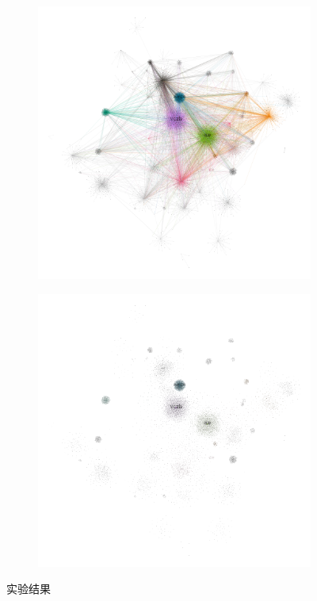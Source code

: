 \documentclass[bachelor,adobefonts]{jnuthesis}
\begin{document}
\begin{figure}[h!]
\begin{subfigure}[b]{0.4\linewidth}
    \caption{}
  \end{subfigure}
  \begin{subfigure}[b]{0.4\linewidth}
    \includegraphics[width=\linewidth]{Open1.png}
    \caption{}
  \end{subfigure}
  \begin{subfigure}[b]{0.4\linewidth}
    \includegraphics[width=\linewidth]{Open2.png}
    \caption{}
  \end{subfigure}
  \caption{实验结果}
\end{figure}
\end{document}

